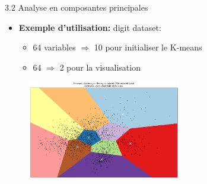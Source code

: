 \begin{frame}{3.2 Analyse en composantes principales}
  \begin{itemize}
  \item \textbf{Exemple d'utilisation:} digit dataset:
    \begin{itemize}
      \normalsize
    \item 64 variables $\Rightarrow$ 10 pour initialiser le K-means
    \item 64 $\Rightarrow$ 2 pour la visualisation
    \end{itemize}
  \end{itemize}
  \begin{figure}
    \includegraphics[width=0.6\textwidth]{fig/PCA.png}
  \end{figure}
\end{frame}
